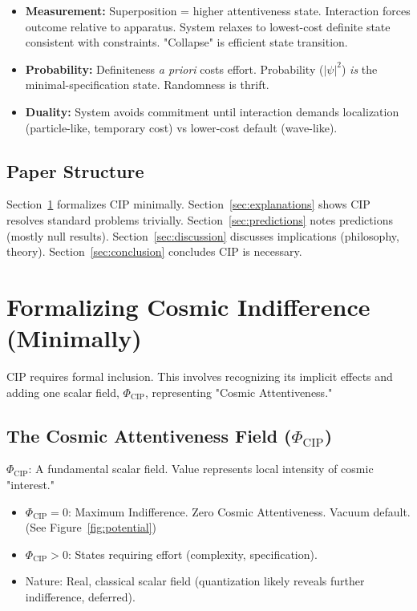\documentclass[11pt, a4paper]{article}
\newcommand{\subt}[1]{\mathrm{#1}}
\begin{document}
\begin{itemize}
    \item \textbf{Measurement:} Superposition = higher attentiveness state. Interaction forces outcome relative to apparatus. System relaxes to lowest-cost definite state consistent with constraints. "Collapse" is efficient state transition.
    \item \textbf{Probability:} Definiteness \textit{a priori} costs effort. Probability ($|\psi|^2$) \textit{is} the minimal-specification state. Randomness is thrift.
    \item \textbf{Duality:} System avoids commitment until interaction demands localization (particle-like, temporary cost) vs lower-cost default (wave-like).
\end{itemize}

\subsection{Paper Structure}

Section~\ref{sec:formalizing} formalizes CIP minimally. Section~\ref{sec:explanations} shows CIP resolves standard problems trivially. Section~\ref{sec:predictions} notes predictions (mostly null results). Section~\ref{sec:discussion} discusses implications (philosophy, theory). Section~\ref{sec:conclusion} concludes CIP is necessary.

\section{Formalizing Cosmic Indifference (Minimally)} \label{sec:formalizing}

CIP requires formal inclusion. This involves recognizing its implicit effects and adding one scalar field, $\Phi_{\subt{CIP}}$, representing "Cosmic Attentiveness."

\subsection{The Cosmic Attentiveness Field ($\Phi_{\subt{CIP}}$)}

$\Phi_{\subt{CIP}}$: A fundamental scalar field. Value represents local intensity of cosmic "interest."
\begin{itemize}
    \item $\Phi_{\subt{CIP}} = 0$: Maximum Indifference. Zero Cosmic Attentiveness. Vacuum default. (See Figure~\ref{fig:potential})
    \item $\Phi_{\subt{CIP}} > 0$: States requiring effort (complexity, specification).
    \item Nature: Real, classical scalar field (quantization likely reveals further indifference, deferred).
\end{itemize}
\end{document}
